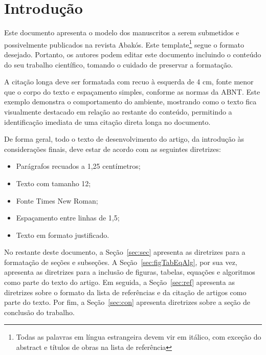 \documentclass[a4paper,12pt]{article}
\begin{document}
	
	
	\revistaheader
	\newpage
	
	\onehalfspace  %
	\setlength{\parindent}{1.25cm}
	
	
	\section{Introdução}
	
	Este documento apresenta o modelo dos manuscritos a serem submetidos e possivelmente publicados na revista Abakós. Este template\footnote{Todas as palavras em língua estrangeira devem vir em itálico, com exceção do abstract e títulos de obras na lista de referência} segue o formato desejado. Portanto, os autores podem editar este documento incluindo o conteúdo do seu trabalho científico, tomando o cuidado de preservar a formatação.
		
	\begin{citacao}
		A citação longa deve ser formatada com recuo à esquerda de 4 cm,
		fonte menor que o corpo do texto e espaçamento simples, conforme as
		normas da ABNT. Este exemplo demonstra o comportamento do ambiente,
		mostrando como o texto fica visualmente destacado em relação ao
		restante do conteúdo, permitindo a identificação imediata de uma
		citação direta longa no documento.
	\end{citacao}
	
	De forma geral, todo o texto de desenvolvimento do artigo, da introdução às considerações finais, deve estar de acordo com as seguintes diretrizes:
	\begin{itemize}
		\item Parágrafos recuados a 1,25 centímetros;
		\item Texto com tamanho 12;
		\item Fonte Times New Roman;
		\item Espaçamento entre linhas de 1,5;
		\item Texto em formato justificado.
	\end{itemize}
	
	No restante deste documento, a Seção~\ref{sec:sec} apresenta as diretrizes para a formatação de seções e subseções. A Seção~\ref{sec:figTabEqAlg}, por sua vez, apresenta as diretrizes para a inclusão de figuras, tabelas, equações e algoritmos como parte do texto do artigo. Em seguida, a Seção~\ref{sec:ref} apresenta as diretrizes sobre o formato da lista de referências e da citação de artigos como parte do texto. Por fim, a Seção~\ref{sec:con} apresenta diretrizes sobre a seção de conclusão do trabalho.
	
\end{document}
